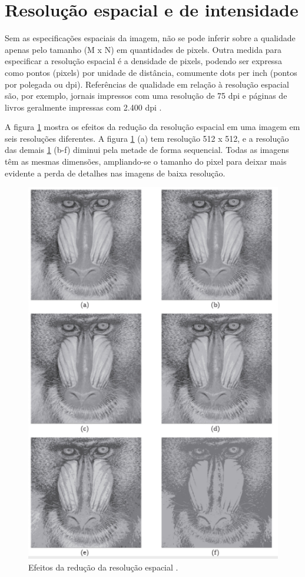 \documentclass[
  brazilian,
]{book}
\begin{document}
\hypertarget{resoluuxe7uxe3o-espacial-e-de-intensidade}{%
\section{Resolução espacial e de intensidade}\label{resoluuxe7uxe3o-espacial-e-de-intensidade}}

Sem as especificações espaciais da imagem, não se pode inferir sobre a qualidade apenas pelo tamanho (M x N) em quantidades de pixels. Outra medida para especificar a resolução espacial é a densidade de pixels, podendo ser expressa como pontos (pixels) por unidade de distância, comumente dots per inch (pontos por polegada ou dpi). Referências de qualidade em relação à resolução espacial são, por exemplo, jornais impressos com uma resolução de 75 dpi e páginas de livros geralmente impressas com 2.400 dpi \autocite{gonzalez2010}.

A figura \ref{fig:resolucaoespacial} mostra os efeitos da redução da resolução espacial em uma imagem em seis resoluções diferentes. A figura \ref{fig:resolucaoespacial} (a) tem resolução 512 x 512, e a resolução das demais \ref{fig:resolucaoespacial} (b-f) diminui pela metade de forma sequencial. Todas as imagens têm as mesmas dimensões, ampliando-se o tamanho do pixel para deixar mais evidente a perda de detalhes nas imagens de baixa resolução.



\begin{figure}

{\centering \includegraphics[width=0.5\linewidth]{imagens/02-formacao/resolucaoespacial} 

}

\caption{Efeitos da redução da resolução espacial \autocite[p.20]{pedrini2008}.}\label{fig:resolucaoespacial}
\end{figure}
\end{document}
